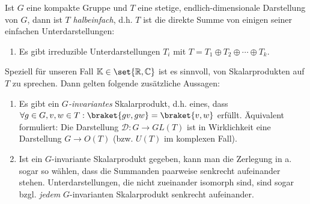 \begin{theorem}\label{darstellungen:maschke}
Ist $G$ eine kompakte Gruppe und $T$ eine stetige, endlich-dimensionale Darstellung von $G$, dann ist $T$ \emph{halbeinfach}, d.h. $T$ ist die direkte Summe von einigen seiner einfachen Unterdarstellungen:
\begin{enumerate}
\item Es gibt irreduzible Unterdarstellungen $T_i$ mit $T=T_1\oplus T_2\oplus\cdots\oplus T_k$.
\end{enumerate}

Speziell für unseren Fall $\IK\in\set{\IR,\IC}$ ist es sinnvoll, von Skalarprodukten auf $T$ zu sprechen. Dann gelten folgende zusätzliche Aussagen:
\begin{enumerate}[resume]
\item Es gibt ein \emph{$G$-invariantes} Skalarprodukt, d.h. eines, dass $\forall g\in G, v,w\in T: \braket{gv,gw} = \braket{v,w}$ erfüllt. Äquivalent formuliert: Die Darstellung $\mathcal{D}: G\to GL(T)$ ist in Wirklichkeit eine Darstellung $G\to O(T)$ (bzw. $U(T)$ im komplexen Fall).
\item Ist ein $G$-invariante Skalarprodukt gegeben, kann man die Zerlegung in a. sogar so wählen, dass die Summanden paarweise senkrecht aufeinander stehen. Unterdarstellungen, die nicht zueinander isomorph sind, sind sogar bzgl. \emph{jedem} $G$-invarianten Skalarprodukt senkrecht aufeinander.
\end{enumerate}
\end{theorem}
